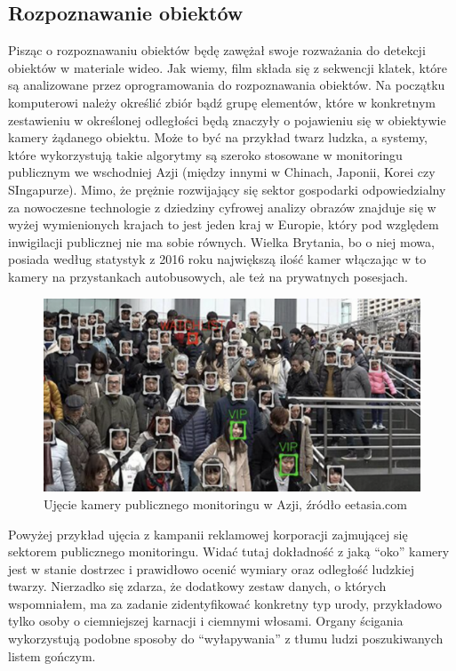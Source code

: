 \documentclass{article}
\begin{document}
	\subsection{Rozpoznawanie obiektów}
	\par
	Pisząc o rozpoznawaniu obiektów będę zawężał swoje rozważania do detekcji obiektów w materiale wideo. Jak wiemy, film składa się z sekwencji klatek, które są analizowane przez oprogramowania do rozpoznawania obiektów. Na początku komputerowi należy określić zbiór bądź grupę elementów, które w konkretnym zestawieniu w określonej odległości będą znaczyły o pojawieniu się w obiektywie kamery żądanego obiektu. Może to być na przykład twarz ludzka, a systemy, które wykorzystują takie algorytmy są szeroko stosowane w monitoringu publicznym we wschodniej Azji (między innymi w Chinach, Japonii, Korei czy SIngapurze). Mimo, że prężnie rozwijający się sektor gospodarki odpowiedzialny za nowoczesne technologie z dziedziny cyfrowej analizy obrazów znajduje się w wyżej wymienionych krajach to jest jeden kraj w Europie, który pod względem inwigilacji publicznej nie ma sobie równych. Wielka Brytania, bo o niej mowa, posiada według statystyk z 2016 roku największą ilość kamer włączając w to kamery na przystankach autobusowych, ale też na prywatnych posesjach.
	\begin{figure}
		\centering
		\includegraphics[width=15cm]{detect}
		\caption{Ujęcie kamery publicznego monitoringu w Azji, źródło eetasia.com}
	\end{figure}
	\par
	Powyżej przykład ujęcia z kampanii reklamowej korporacji zajmującej się sektorem publicznego monitoringu. Widać tutaj dokładność z jaką “oko” kamery jest w stanie dostrzec i prawidłowo ocenić wymiary oraz odległość ludzkiej twarzy. Nierzadko się zdarza, że dodatkowy zestaw danych, o których wspomniałem, ma za zadanie zidentyfikować konkretny typ urody, przykładowo tylko osoby o ciemniejszej karnacji i ciemnymi włosami. Organy ścigania wykorzystują podobne sposoby do “wyłapywania” z tłumu ludzi poszukiwanych listem gończym.
\end{document}
